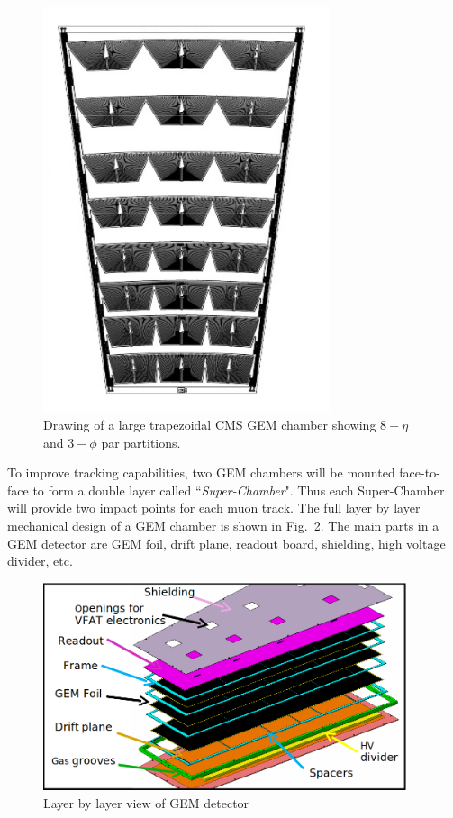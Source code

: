 \begin{figure}[!htbp]
    \begin{center}
        \includegraphics[angle=-90,width=0.75\textwidth]{figures/GEM/gemTrapezoidal.png}
        \caption{Drawing of a large trapezoidal CMS GEM chamber showing $8-\eta$ and $3-\phi$ par partitions.}
        \label{fig:gemTrapezoidal}
    \end{center}
\end{figure} 
To improve tracking capabilities, two GEM chambers will be mounted face-to-face to form a double layer called ``\textit{Super-Chamber}".
Thus each Super-Chamber will provide two impact points for each muon track.
The full layer by layer mechanical design of a GEM chamber is shown in Fig.~\ref{fig:GE1/1}. 
The main parts in a GEM detector are GEM foil, drift plane, readout board, shielding, high voltage divider, etc.
\begin{figure}[!htbp]
    \begin{center}
        \includegraphics[width=0.95\textwidth]{figures/GEM/GE11cad.png}
        \caption{Layer by layer view of GEM detector}
        \label{fig:GE1/1}
    \end{center}
\end{figure} 
